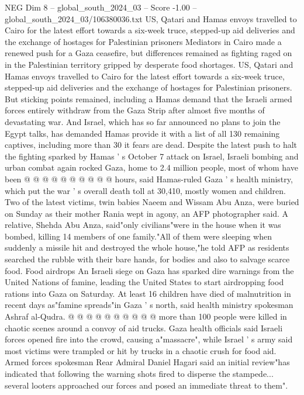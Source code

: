 \begin{textsample}{NEG Dim 8 – global\_south\_2024\_03 – Score -1.00 – global\_south\_2024\_03/106380036.txt}  \label{ex:f8_neg_027}
US, Qatari and Hamas envoys travelled to Cairo for the latest effort towards a six-week truce, stepped-up aid deliveries and the exchange of hostages for Palestinian prisoners Mediators in Cairo made a renewed push for a Gaza ceasefire, but differences remained as fighting raged on in the Palestinian territory gripped by desperate food shortages.
US, Qatari and Hamas envoys travelled to Cairo for the latest effort towards a six-week truce, stepped-up aid deliveries and the exchange of hostages for Palestinian prisoners.
But sticking points remained, including a Hamas demand that the Israeli armed forces entirely withdraw from the Gaza Strip after almost five months of devastating war.
And Israel, which has so far announced no plans to join the Egypt talks, has demanded Hamas provide it with a list of all 130 remaining captives, including more than 30 it fears are dead.
Despite the latest push to halt the fighting sparked by Hamas ' s October 7 attack on Israel, Israeli bombing and urban combat again rocked Gaza, home to 2.4 million people, most of whom have been @ @ @ @ @ @ @ @ @ @ hours, said Hamas-ruled Gaza ' s health ministry, which put the war ' s overall death toll at 30,410, mostly women and children.
Two of the latest victims, twin babies Naeem and Wissam Abu Anza, were buried on Sunday as their mother Rania wept in agony, an AFP photographer said.
A relative, Shehda Abu Anza, said"only civilians"were in the house when it was bombed, killing 14 members of one family."All of them were sleeping when suddenly a missile hit and destroyed the whole house,"he told AFP as residents searched the rubble with their bare hands, for bodies and also to salvage scarce food.
Food airdrops An Israeli siege on Gaza has sparked dire warnings from the United Nations of famine, leading the United States to start airdropping food rations into Gaza on Saturday.
At least 16 children have died of malnutrition in recent days as"famine spreads"in Gaza ' s north, said health ministry spokesman Ashraf al-Qudra. @ @ @ @ @ @ @ @ @ @ more than 100 people were killed in chaotic scenes around a convoy of aid trucks.
Gaza health officials said Israeli forces opened fire into the crowd, causing a"massacre", while Israel ' s army said most victims were trampled or hit by trucks in a chaotic crush for food aid.
Armed forces spokesman Rear Admiral Daniel Hagari said an initial review"has indicated that following the warning shots fired to disperse the stampede... several looters approached our forces and posed an immediate threat to them".

\end{textsample}

